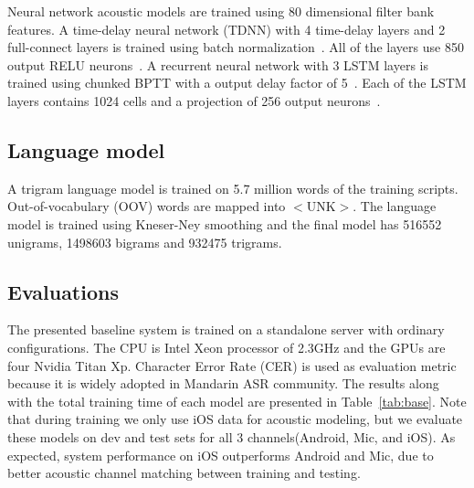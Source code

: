 \documentclass[a4paper]{article}
\begin{document}
Neural network acoustic models are trained using 80 dimensional filter bank
features. A time-delay neural network (TDNN) with 4 time-delay layers and 2
full-connect layers is trained using batch normalization~\cite{tdnn}. All of the
layers use 850 output RELU neurons~\cite{relu}. A recurrent neural network with
3 LSTM layers is trained using chunked BPTT with a output delay factor of
5~\cite{lstm}. Each of the LSTM layers contains 1024 cells and a projection of
256 output neurons~\cite{lstmp}.

\subsection{Language model}

A trigram language model is trained on 5.7 million words of the training
scripts. Out-of-vocabulary (OOV) words are mapped into $<$UNK$>$. The language
model is trained using Kneser-Ney smoothing and the final model has 516552
unigrams, 1498603 bigrams and 932475 trigrams.

\subsection{Evaluations}

The presented baseline system is trained on a standalone server with ordinary
configurations. The CPU is Intel Xeon processor of 2.3GHz and the GPUs are four
Nvidia Titan Xp. Character Error Rate (CER) is used as evaluation metric because
it is widely adopted in Mandarin ASR community. The results along with the total
training time of each model are presented in Table~\ref{tab:base}. Note that
during training we only use iOS data for acoustic modeling, but we evaluate
these models on dev and test sets for all 3 channels(Android, Mic, and iOS). As
expected, system performance on iOS outperforms Android and Mic, due to better
acoustic channel matching between training and testing.
\end{document}

